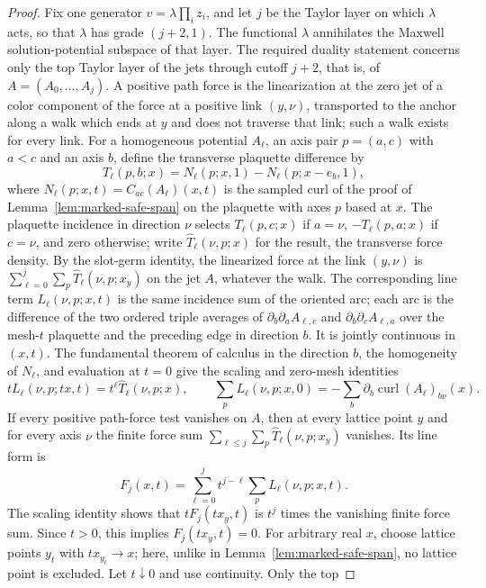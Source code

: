 \begin{proof}
Fix one generator $v=\lambda\prod_iz_i$, and let $j$ be the Taylor layer
on which $\lambda$ acts, so that $\lambda$ has grade $(j+2,1)$. The
functional $\lambda$ annihilates the Maxwell solution-potential subspace
of that layer.
The required duality statement concerns only the top Taylor layer of the
jets through cutoff $j+2$, that is, of $A=(A_0,\ldots,A_j)$. A positive
path force is the linearization at the zero jet of a color component of
the force at a positive link $(y,\nu)$, transported to the anchor along a
walk which ends at $y$ and does not traverse that link; such a walk exists
for every link. For a homogeneous potential $A_\ell$, an axis pair
$p=(a,c)$ with $a<c$ and an axis $b$, define the transverse plaquette
difference by
\[
 T_\ell(p,b;x)=N_\ell(p;x,1)-N_\ell(p;x-e_b,1),
\]
where $N_\ell(p;x,t)=C_{ac}(A_\ell)(x,t)$ is the sampled curl of the
proof of Lemma~\ref{lem:marked-safe-span} on the plaquette with axes $p$
based at $x$. The plaquette incidence in direction $\nu$ selects
$T_\ell(p,c;x)$ if $a=\nu$, $-T_\ell(p,a;x)$ if $c=\nu$, and zero
otherwise; write $\widehat T_\ell(\nu,p;x)$ for the result, the
transverse force density. By the slot-germ identity, the linearized force
at the link $(y,\nu)$ is $\sum_{\ell=0}^{j}\sum_p
\widehat T_\ell(\nu,p;x_y)$ on the jet $A$, whatever the walk. The
corresponding line term
$L_\ell(\nu,p;x,t)$ is the same incidence sum of the oriented arc; each arc
is the difference of the two ordered triple averages of
$\partial_b\partial_a A_{\ell,c}$ and $\partial_b\partial_c A_{\ell,a}$
over the mesh-$t$ plaquette and the preceding edge in direction $b$. It is
jointly continuous in $(x,t)$. The fundamental theorem of calculus in the
direction $b$, the homogeneity of $N_\ell$, and evaluation at $t=0$ give
the scaling and zero-mesh identities
\[
 t L_\ell(\nu,p;t x,t)=t^\ell \widehat T_\ell(\nu,p;x),\qquad
 \sum_p L_\ell(\nu,p;x,0)
       =-\sum_b\partial_b\operatorname{curl}(A_\ell)_{b\nu}(x).
\]
If every positive path-force test vanishes on $A$, then at every lattice
point $y$ and for every axis $\nu$ the finite force sum
$\sum_{\ell\le j}\sum_p\widehat T_\ell(\nu,p;x_y)$ vanishes. Its line
form is
\[
 F_j(x,t)=\sum_{\ell=0}^j t^{j-\ell}
                    \sum_p L_\ell(\nu,p;x,t).
\]
The scaling identity shows that $tF_j(t x_y,t)$ is $t^j$ times the
vanishing finite force sum. Since $t>0$, this implies
$F_j(t x_y,t)=0$. For arbitrary real $x$, choose lattice points $y_t$ with
$t x_{y_t}\to x$; here, unlike in Lemma~\ref{lem:marked-safe-span}, no
lattice point is excluded. Let
$t\downarrow0$ and use continuity. Only the top

\end{proof}
